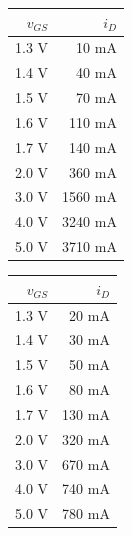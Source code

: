\documentclass{article}
\begin{document}
\begin{figure}[H]
\begin{minipage}{.5\textwidth}
\begin{tabular}{ | r | r | }
    \hline
    $v_{GS}$ & $i_D$ \\ \hline
     1.3 \si{\volt} & 10 \si{\milli \ampere}  \\ \hline
     1.4 \si{\volt} & 40 \si{\milli \ampere}  \\ \hline
     1.5 \si{\volt} & 70 \si{\milli \ampere}  \\ \hline
     1.6 \si{\volt} & 110 \si{\milli \ampere}  \\ \hline
     1.7 \si{\volt} & 140 \si{\milli \ampere}  \\ \hline
     2.0 \si{\volt} & 360 \si{\milli \ampere}  \\ \hline
     3.0 \si{\volt} & 1560 \si{\milli \ampere}  \\ \hline
     4.0 \si{\volt} & 3240 \si{\milli \ampere}  \\ \hline
     5.0 \si{\volt} & 3710 \si{\milli \ampere}  \\ \hline
\end{tabular}
\end{minipage}
\begin{minipage}{.5\textwidth}
\begin{tabular}{ | r | r | }
    \hline
    $v_{GS}$ & $i_D$ \\ \hline
      1.3 \si{\volt} & 20 \si{\milli \ampere}  \\ \hline
      1.4 \si{\volt} & 30 \si{\milli \ampere}  \\ \hline
      1.5 \si{\volt} & 50 \si{\milli \ampere}  \\ \hline
      1.6 \si{\volt} & 80 \si{\milli \ampere}  \\ \hline
      1.7 \si{\volt} & 130 \si{\milli \ampere}  \\ \hline
      2.0 \si{\volt} & 320 \si{\milli \ampere}  \\ \hline
      3.0 \si{\volt} & 670 \si{\milli \ampere}  \\ \hline
      4.0 \si{\volt} & 740 \si{\milli \ampere}  \\ \hline
      5.0 \si{\volt} & 780 \si{\milli \ampere}  \\ \hline
\end{tabular}
\end{minipage}
\end{figure}
\end{document}
